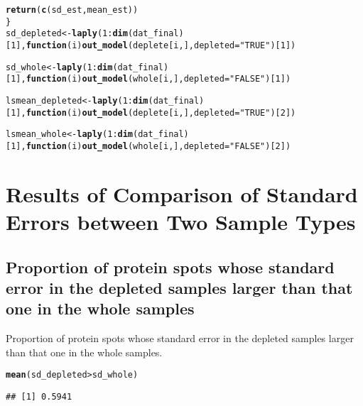 \documentclass{article}\usepackage[]{graphicx}\usepackage[]{color}
\makeatletter
\newcommand{\hlnum}[1]{\textcolor[rgb]{0.686,0.059,0.569}{#1}}%
\newcommand{\hlstr}[1]{\textcolor[rgb]{0.192,0.494,0.8}{#1}}%
\newcommand{\hlopt}[1]{\textcolor[rgb]{0,0,0}{#1}}%
\newcommand{\hlstd}[1]{\textcolor[rgb]{0.345,0.345,0.345}{#1}}%
\newcommand{\hlkwa}[1]{\textcolor[rgb]{0.161,0.373,0.58}{\textbf{#1}}}%
\newcommand{\hlkwb}[1]{\textcolor[rgb]{0.69,0.353,0.396}{#1}}%
\newcommand{\hlkwc}[1]{\textcolor[rgb]{0.333,0.667,0.333}{#1}}%
\newcommand{\hlkwd}[1]{\textcolor[rgb]{0.737,0.353,0.396}{\textbf{#1}}}%
\newenvironment{kframe}{%
 \def\at@end@of@kframe{}%
 \ifinner\ifhmode%
  \def\at@end@of@kframe{\end{minipage}}%
  \begin{minipage}{\columnwidth}%
 \fi\fi%
 \def\FrameCommand##1{\hskip\@totalleftmargin \hskip-\fboxsep
 \colorbox{shadecolor}{##1}\hskip-\fboxsep
     \hskip-\linewidth \hskip-\@totalleftmargin \hskip\columnwidth}%
 \MakeFramed {\advance\hsize-\width
   \@totalleftmargin\z@ \linewidth\hsize
   \@setminipage}}%
 {\par\unskip\endMakeFramed%
 \at@end@of@kframe}
\newenvironment{knitrout}{}{} %
\makeatother
\begin{document}
\begin{knitrout}
\begin{kframe}
\begin{alltt}
  \hlkwd{return}\hlstd{(}\hlkwd{c}\hlstd{(sd_est, mean_est))}
\hlstd{\}}
\hlstd{sd_depleted} \hlkwb{<-} \hlkwd{laply}\hlstd{(}\hlnum{1}\hlopt{:}\hlkwd{dim}\hlstd{(dat_final)[}\hlnum{1}\hlstd{],} \hlkwa{function}\hlstd{(}\hlkwc{i}\hlstd{)}\hlkwd{out_model}\hlstd{(deplete[i,],} \hlkwc{depleted} \hlstd{=} \hlstr{"TRUE"}\hlstd{)[}\hlnum{1}\hlstd{])}

\hlstd{sd_whole} \hlkwb{<-} \hlkwd{laply}\hlstd{(}\hlnum{1}\hlopt{:}\hlkwd{dim}\hlstd{(dat_final)[}\hlnum{1}\hlstd{],} \hlkwa{function}\hlstd{(}\hlkwc{i}\hlstd{)}\hlkwd{out_model}\hlstd{(whole[i,],} \hlkwc{depleted} \hlstd{=} \hlstr{"FALSE"}\hlstd{)[}\hlnum{1}\hlstd{])}

\hlstd{lsmean_depleted} \hlkwb{<-} \hlkwd{laply}\hlstd{(}\hlnum{1}\hlopt{:}\hlkwd{dim}\hlstd{(dat_final)[}\hlnum{1}\hlstd{],} \hlkwa{function}\hlstd{(}\hlkwc{i}\hlstd{)}\hlkwd{out_model}\hlstd{(deplete[i,],} \hlkwc{depleted} \hlstd{=} \hlstr{"TRUE"}\hlstd{)[}\hlnum{2}\hlstd{])}

\hlstd{lsmean_whole} \hlkwb{<-} \hlkwd{laply}\hlstd{(}\hlnum{1}\hlopt{:}\hlkwd{dim}\hlstd{(dat_final)[}\hlnum{1}\hlstd{],} \hlkwa{function}\hlstd{(}\hlkwc{i}\hlstd{)}\hlkwd{out_model}\hlstd{(whole[i,],} \hlkwc{depleted} \hlstd{=} \hlstr{"FALSE"}\hlstd{)[}\hlnum{2}\hlstd{])}
\end{alltt}
\end{kframe}
\end{knitrout}


\section{Results of Comparison of Standard Errors between Two Sample Types}
\subsection{Proportion of protein spots whose standard error in the depleted samples larger than that one  in the whole samples}
Proportion of protein spots whose standard error in the depleted samples larger than that one  in the whole samples.
\begin{knitrout}
\color{fgcolor}\begin{kframe}
\begin{alltt}
\hlkwd{mean}\hlstd{(sd_depleted} \hlopt{>} \hlstd{sd_whole)}
\end{alltt}
\begin{verbatim}
## [1] 0.5941
\end{verbatim}
\end{kframe}
\end{knitrout}
\end{document}
